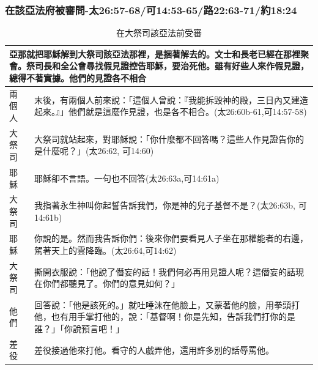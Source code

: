 \subsubsection{在該亞法府被審問-太26:57-68/可14:53-65/路22:63-71/約18:24}
\begin{table}[htbp]
  \centering 
    \begin{tabular}{|p{3em}|p{40em}|}
    \toprule
    \multicolumn{2}{|p{43em}|}{\textcolor[rgb]{ 0,  .075,  .125}{亞那就把耶穌解到大祭司該亞法那裡，是捆著解去的。文士和長老已經在那裡聚會。祭司長和全公會尋找假見證控告耶穌，要治死他。雖有好些人來作假見證，總得不著實據。他們的見證各不相合}} \\
    \midrule
    \textcolor[rgb]{ 0,  .075,  .125}{兩個人} & \textcolor[rgb]{ 0,  .075,  .125}{末後，有兩個人前來說：「這個人曾說：『我能拆毀神的殿，三日內又建造起來。』」他們就是這麼作見證，也是各不相合。(太26:60b-61,可14:57-58)} \\
    \midrule
    \textcolor[rgb]{ 0,  .075,  .125}{大祭司} & \textcolor[rgb]{ 0,  .075,  .125}{大祭司就站起來，對耶穌說：「你什麼都不回答嗎？這些人作見證告你的是什麼呢？」(太26:62, 可14:60)} \\
    \midrule
    \textcolor[rgb]{ 0,  .075,  .125}{耶穌} & \textcolor[rgb]{ 0,  .075,  .125}{耶穌卻不言語。一句也不回答(太26:63a,可14:61a)} \\
    \midrule
    \textcolor[rgb]{ 0,  .075,  .125}{大祭司} & \textcolor[rgb]{ 0,  .075,  .125}{我指著永生神叫你起誓告訴我們，你是神的兒子基督不是？(太26:63b, 可14:61b)} \\
    \midrule
    \textcolor[rgb]{ 0,  .075,  .125}{耶穌} & 你說的是。然而我告訴你們：後來你們要看見人子坐在那權能者的右邊，駕著天上的雲降臨。(太26:64,可14:62) \\
    \midrule
    \textcolor[rgb]{ 0,  .075,  .125}{大祭司} & 撕開衣服說：「他說了僭妄的話！我們何必再用見證人呢？這僭妄的話現在你們都聽見了。你們的意見如何？」 \\
    \midrule
    \textcolor[rgb]{ 0,  .075,  .125}{他們} & 回答說：「他是該死的。」就吐唾沫在他臉上，又蒙著他的臉，用拳頭打他，也有用手掌打他的，說：「基督啊！你是先知，告訴我們打你的是誰？」「你說預言吧！」 \\
    \midrule
    差役&	差役接過他來打他。看守的人戲弄他，還用許多別的話辱罵他。\\
    \bottomrule
    \end{tabular}%
     \caption{在大祭司該亞法前受審}
  \label{tab:addlabel}%
\end{table}
